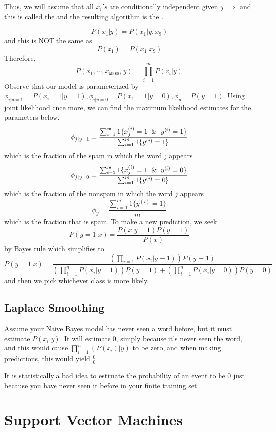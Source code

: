 \documentclass[12pt]{scrartcl}
\begin{document}
Thus, we will assume that all $x_i's$ are conditionally independent given $y \implies$ and this is called the  and the resulting algorithm is the .

\[P(x_1 | y) = P(x_1 | y, x_9)\] and this is NOT the same as 
\[P(x_1) = P(x_1 | x_9)\]
Therefore, 
\[P(x_1, \cdots, x_{50000} | y) = \prod_{i=1}^m P(x_i | y)\]
Observe that our model is parameterized by $\phi_{i | y = 1} = P(x_i = 1 | y = 1), \phi_{i | y = 0} = P(x_1 = 1 | y = 0), \phi_y = P(y = 1)$. Using joint likelihood once more, we can find the maximum likelihood estimates for the parameters below.
\[\phi_{j | y = 1} = \frac{\sum_{i=1}^m 1\{x_j^{(i)} = 1 \And y^{(i)} = 1\}}{\sum_{i=1}^m 1\{y^{(i)} = 1\}}\]
which is the fraction of the spam in which the word $j$ appears
\[\phi_{j | y = 0} = \frac{\sum_{i=1}^m 1\{x_j^{(i)} = 1 \And y^{(i)} = 0\}}{\sum_{i=1}^m 1\{y^{(i)} = 0\}}\]
which is the fraction of the nonspam in which the word $j$ appears
\[\phi_{y} = \frac{\sum_{i=1}^m 1\{y^{(i)} = 1\}}{m}\]
which is the fraction that is spam.
To make a new prediction, we seek \[P(y = 1 | x) = \frac{P(x| y = 1)P(y = 1)}{P(x)}\]
by Bayes rule which simplifies to 
\[P(y = 1 | x) = \frac{(\prod_{i=1}P(x_i | y = 1))P(y = 1)}{(\prod_{i=1}^nP(x_i | y = 1))P(y = 1) + (\prod_{i=1}^nP(x_i | y = 0))P(y=0)}\]
and then we pick whichever class is more likely.

\subsection{Laplace Smoothing}

Assume your Naive Bayes model has never seen a word before, but it must estimate $P(x_i | y)$. It will estimate 0, simply because it's never seen the word, and this would cause $\prod_{i=1}^n (P(x_i) | y)$ to be zero, and when making predictions, this would yield $\frac{0}{0}$.

\begin{note}
    It is statistically a bad idea to estimate the probability of an event to be 0 just because you have never seen it before in your finite training set. 
\end{note}

\section{Support Vector Machines}




\end{document}
